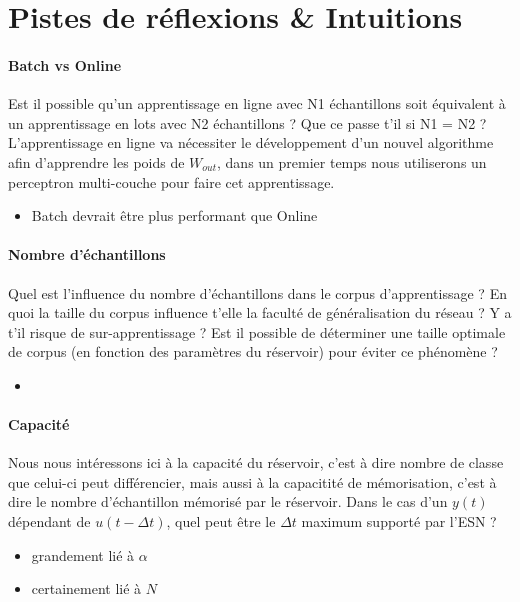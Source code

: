 \documentclass[12pt]{article}
\begin{document}
\section{Pistes de réflexions \& Intuitions}

\paragraph{Batch vs Online}
Est il possible qu'un apprentissage en ligne avec N1 échantillons soit équivalent à un apprentissage en lots avec N2 échantillons ? Que ce passe t'il si N1 = N2 ? L'apprentissage en ligne va nécessiter le développement d'un nouvel algorithme afin d'apprendre les poids de $W_{out}$, dans un premier temps nous utiliserons un perceptron multi-couche pour faire cet apprentissage.

\begin{itemize}
\item Batch devrait être plus performant que Online
\end{itemize}

\paragraph{Nombre d'échantillons}
Quel est l'influence du nombre d'échantillons dans le corpus d'apprentissage ? En quoi la taille du corpus influence t'elle la faculté de généralisation du réseau ? Y a t'il risque de sur-apprentissage ? Est il possible de déterminer une taille optimale de corpus (en fonction des paramètres du réservoir) pour éviter ce phénomène ?

\begin{itemize}
\item 
\end{itemize}

\paragraph{Capacité}
Nous nous intéressons ici à la capacité du réservoir, c'est à dire nombre de classe que celui-ci peut différencier, mais aussi à la capacitité de mémorisation, c'est à dire le nombre d'échantillon mémorisé par le réservoir. Dans le cas d'un $y(t)$ dépendant de $u(t-\Delta t)$, quel peut être le $\Delta t$ maximum supporté par l'ESN ?

\begin{itemize}
\item grandement lié à $\alpha$
\item certainement lié à $N$
\end{itemize}
\end{document}
